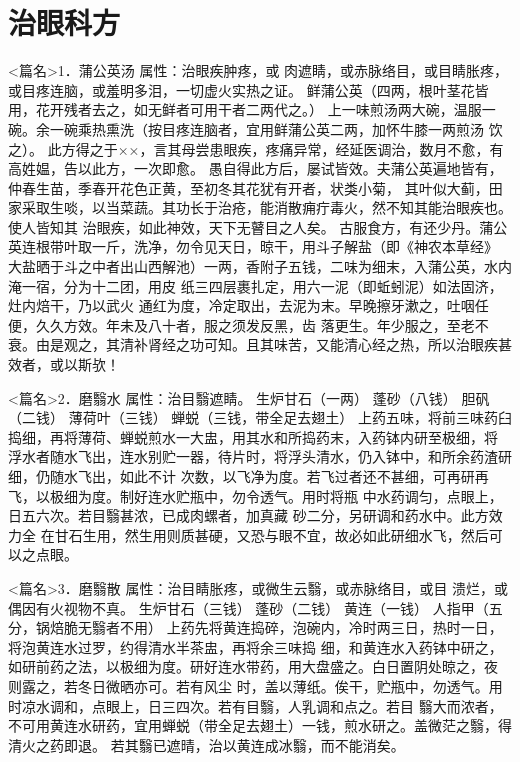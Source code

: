 \documentclass[a4paper,12pt,UTF8,twoside]{ctexbook}
\begin{document}
\chapter{治眼科方}
<篇名>1．蒲公英汤
属性：治眼疾肿疼，或 肉遮睛，或赤脉络目，或目睛胀疼，或目疼连脑，或羞明多泪，一切虚火实热之证。 
鲜蒲公英（四两，根叶茎花皆用，花开残者去之，如无鲜者可用干者二两代之。） 
上一味煎汤两大碗，温服一碗。余一碗乘热熏洗（按目疼连脑者，宜用鲜蒲公英二两，加怀牛膝一两煎汤 
饮之）。 
此方得之于××，言其母尝患眼疾，疼痛异常，经延医调治，数月不愈，有高姓媪，告以此方，一次即愈。 
愚自得此方后，屡试皆效。夫蒲公英遍地皆有，仲春生苗，季春开花色正黄，至初冬其花犹有开者，状类小菊， 
其叶似大蓟，田家采取生啖，以当菜蔬。其功长于治疮，能消散痈疔毒火，然不知其能治眼疾也。使人皆知其 
治眼疾，如此神效，天下无瞽目之人矣。 
古服食方，有还少丹。蒲公英连根带叶取一斤，洗净，勿令见天日，晾干，用斗子解盐（即《神农本草经》 
大盐晒于斗之中者出山西解池）一两，香附子五钱，二味为细末，入蒲公英，水内淹一宿，分为十二团，用皮 
纸三四层裹扎定，用六一泥（即蚯蚓泥）如法固济，灶内焙干，乃以武火 
通红为度，冷定取出，去泥为末。早晚擦牙漱之，吐咽任便，久久方效。年未及八十者，服之须发反黑，齿 
落更生。年少服之，至老不衰。由是观之，其清补肾经之功可知。且其味苦，又能清心经之热，所以治眼疾甚 
效者，或以斯欤！ 


<篇名>2．磨翳水
属性：治目翳遮睛。 
生炉甘石（一两） 蓬砂（八钱） 胆矾（二钱） 薄荷叶（三钱） 蝉蜕（三钱，带全足去翅土） 
上药五味，将前三味药臼捣细，再将薄荷、蝉蜕煎水一大盅，用其水和所捣药末，入药钵内研至极细，将 
浮水者随水飞出，连水别贮一器，待片时，将浮头清水，仍入钵中，和所余药渣研细，仍随水飞出，如此不计 
次数，以飞净为度。若飞过者还不甚细，可再研再飞，以极细为度。制好连水贮瓶中，勿令透气。用时将瓶 
中水药调匀，点眼上，日五六次。若目翳甚浓，已成肉螺者，加真藏 砂二分，另研调和药水中。此方效力全 
在甘石生用，然生用则质甚硬，又恐与眼不宜，故必如此研细水飞，然后可以之点眼。 


<篇名>3．磨翳散
属性：治目睛胀疼，或微生云翳，或赤脉络目，或目 溃烂，或偶因有火视物不真。 
生炉甘石（三钱） 蓬砂（二钱） 黄连（一钱） 人指甲（五分，锅焙脆无翳者不用） 
上药先将黄连捣碎，泡碗内，冷时两三日，热时一日，将泡黄连水过罗，约得清水半茶盅，再将余三味捣 
细，和黄连水入药钵中研之，如研前药之法，以极细为度。研好连水带药，用大盘盛之。白日置阴处晾之，夜 
则露之，若冬日微晒亦可。若有风尘 
时，盖以薄纸。俟干，贮瓶中，勿透气。用时凉水调和，点眼上，日三四次。若有目翳，人乳调和点之。若目 
翳大而浓者，不可用黄连水研药，宜用蝉蜕（带全足去翅土）一钱，煎水研之。盖微茫之翳，得清火之药即退。 
若其翳已遮晴，治以黄连成冰翳，而不能消矣。 
\end{document}
